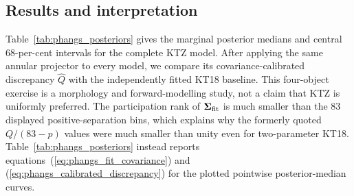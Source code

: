 \documentclass[fleqn,usenatbib]{mnras}
\begin{document}
\subsection{Results and interpretation}
\label{ssec:phangs_results}

Table~\ref{tab:phangs_posteriors} gives the marginal posterior medians and central 68-per-cent intervals for the complete KTZ model.  After applying the same annular projector to every model, we compare its covariance-calibrated discrepancy $\widehat Q$ with the independently fitted KT18 baseline.  This four-object exercise is a morphology and forward-modelling study, not a claim that KTZ is uniformly preferred.  The participation rank of $\boldsymbol\Sigma_{\rm fit}$ is much smaller than the 83 displayed positive-separation bins, which explains why the formerly quoted $Q/(83-p)$ values were much smaller than unity even for two-parameter KT18.  Table~\ref{tab:phangs_posteriors} instead reports equations~(\ref{eq:phangs_fit_covariance}) and (\ref{eq:phangs_calibrated_discrepancy}) for the plotted pointwise posterior-median curves.
\end{document}
